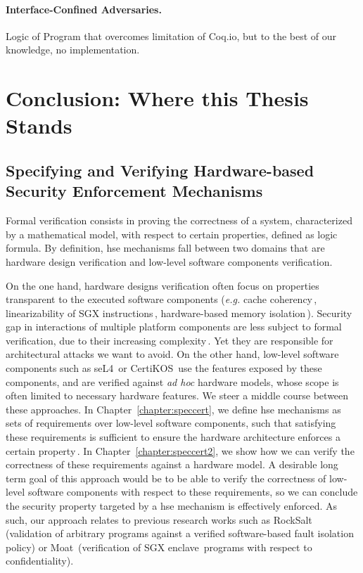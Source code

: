 \paragraph{Interface-Confined Adversaries.}
%
Logic of Program that overcomes limitation of Coq.io, but to the best of our
knowledge, no implementation.

\section{Conclusion: Where this Thesis Stands}
\label{sec:sota:conclusion}

\subsection{Specifying and Verifying Hardware-based Security Enforcement
  Mechanisms}

Formal verification consists in proving the correctness of a system,
characterized by a mathematical model, with respect to certain properties,
defined as logic formula.
%
By definition, \ac{hse} mechanisms fall between two domains that are hardware
design verification and low-level software components verification.

On the one hand, hardware designs verification often focus on properties
transparent to the executed software components (\emph{e.g.} cache
coherency\,\cite{stern1995cachecoherence}, linearizability of SGX
instructions\,\cite{leslie2015sgx}, hardware-based memory
isolation\,\cite{lie2003xom}).
%
Security gap in interactions of multiple platform components are less subject to
formal verification, due to their increasing
complexity\,\cite{potlapally2011hardwaresecurity}.
%
Yet they are responsible for architectural attacks we want to avoid.
%
On the other hand, low-level software components such as
seL4\,\cite{klein2009sel4} or CertiKOS\,\cite{gu2016certikos} use the features
exposed by these components, and are verified against \emph{ad hoc} hardware
models, whose scope is often limited to necessary hardware features.
%
We steer a middle course between these approaches.
%
In Chapter~\ref{chapter:speccert}, we define \ac{hse} mechanisms as sets of
requirements over low-level software components, such that satisfying these
requirements is sufficient to ensure the hardware architecture enforces a
certain property\,\cite{letan2016speccert}.
%
In Chapter~\ref{chapter:speccert2}, we show how we can verify the correctness of
these requirements against a hardware model.
%
A desirable long term goal of this approach would be to be able to verify the
correctness of low-level
software components with respect to these requirements, so we can conclude the
security property targeted by a \ac{hse} mechanism is effectively enforced.
%
As such, our approach relates to previous research works such as
RockSalt\,\cite{morrisett2012rocksalt} (validation of arbitrary programs against
a verified software-based fault isolation\,\cite{wahbe1994sfi} policy) or
Moat\,\cite{sinha2015moat} (verification of SGX
enclave\,\cite{costan2016sgxexplained} programs with respect to
confidentiality).

